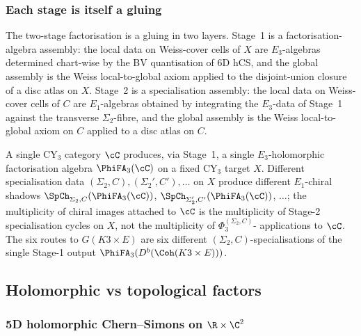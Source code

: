 \subsubsection{Each stage is itself a gluing}
\label{subsec:fa-each-stage-gluing}

The two-stage factorisation is a gluing in two layers. Stage~1 is
a factorisation-algebra assembly: the local data on Weiss-cover cells
of $X$ are $E_3$-algebras determined chart-wise by the BV quantisation
of 6D hCS, and the global assembly is the Weiss local-to-global axiom
applied to the disjoint-union closure of a disc atlas on $X$. Stage~2
is a specialisation assembly: the local data on Weiss-cover cells of
$C$ are $E_1$-algebras obtained by integrating the $E_3$-data of
Stage~1 against the transverse $\Sigma_2$-fibre, and the global
assembly is the Weiss local-to-global axiom on $C$ applied to a disc
atlas on $C$.

\begin{remark}
\label{rem:six-sigma2-C-specialisations}
A single CY$_3$ category $\cC$ produces, via Stage~1, a single
$E_3$-holomorphic factorisation algebra $\PhiFA_3(\cC)$ on a fixed
CY$_3$ target $X$. Different specialisation data
$(\Sigma_2, C), (\Sigma_2', C'), \dots$ on $X$ produce different
$E_1$-chiral shadows $\SpCh_{\Sigma_2, C}(\PhiFA_3(\cC))$,
$\SpCh_{\Sigma_2', C'}(\PhiFA_3(\cC))$, $\dots$; the multiplicity of
chiral images attached to $\cC$ is the multiplicity of Stage-2
specialisation cycles on $X$, not the multiplicity of $\Phi_3^{(\Sigma_2, C)}$-
applications to $\cC$. The six routes to $G(K3 \times E)$ are six
different $(\Sigma_2, C)$-specialisations of the single Stage-1 output
$\PhiFA_3(D^b(\Coh(K3 \times E)))$.
\end{remark}

\subsection{Holomorphic vs topological factors}
\label{sec:fa-hol-top}

\subsubsection{5D holomorphic Chern--Simons on $\R \times \C^2$}

